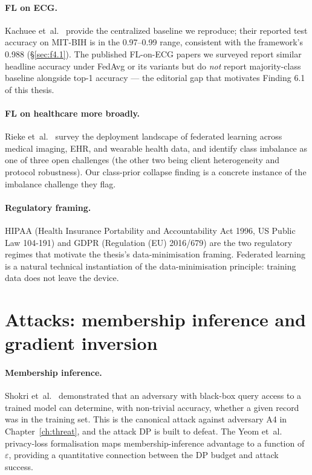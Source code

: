\documentclass[11pt,a4paper]{report}
\begin{document}
\paragraph{FL on ECG.} Kachuee et~al.~\cite{kachuee2018ecg} provide the
centralized baseline we reproduce; their reported test accuracy on
MIT-BIH is in the 0.97--0.99 range, consistent with the framework's
0.988 (\S\ref{sec:f4.1}). The published FL-on-ECG papers we surveyed
report similar headline accuracy under FedAvg or its variants but do
\emph{not} report majority-class baseline alongside top-1 accuracy ---
the editorial gap that motivates Finding 6.1 of this thesis.

\paragraph{FL on healthcare more broadly.} Rieke
et~al.~\cite{rieke2020future} survey the deployment landscape of
federated learning across medical imaging, EHR, and wearable health
data, and identify class imbalance as one of three open challenges (the
other two being client heterogeneity and protocol robustness). Our
class-prior collapse finding is a concrete instance of the imbalance
challenge they flag.

\paragraph{Regulatory framing.} HIPAA (Health Insurance Portability and
Accountability Act 1996, US Public Law 104-191) and GDPR (Regulation
(EU) 2016/679) are the two regulatory regimes that motivate the
thesis's data-minimisation framing. Federated learning is a natural
technical instantiation of the data-minimisation principle: training
data does not leave the device.

\section{Attacks: membership inference and gradient inversion}\label{sec:rw-attacks}

\paragraph{Membership inference.} Shokri
et~al.~\cite{shokri2017membership} demonstrated that an adversary with
black-box query access to a trained model can determine, with non-trivial
accuracy, whether a given record was in the training set. This is the
canonical attack against adversary A4 in Chapter~\ref{ch:threat}, and the
attack DP is built to defeat. The Yeom
et~al.~\cite{yeom2018membership} privacy-loss formalisation maps
membership-inference advantage to a function of $\varepsilon$, providing
a quantitative connection between the DP budget and attack success.
\end{document}
